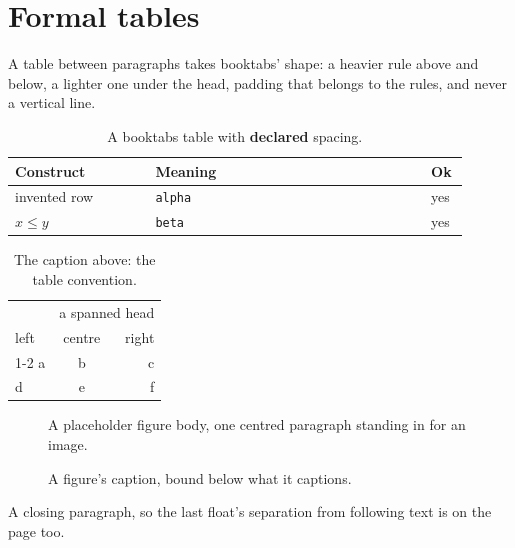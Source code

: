 \documentclass{article}
\begin{document}
\section{Formal tables}

A table between paragraphs takes booktabs' shape: a heavier rule above and
below, a lighter one under the head, padding that belongs to the rules, and
never a vertical line.

\begin{table}
\centering
\begin{tabular}{@{}p{0.29\linewidth}p{0.55\linewidth}p{0.06\linewidth}@{}}
  \toprule
  \textbf{Construct} & \textbf{Meaning} & \textbf{Ok} \\
  \midrule
  invented row & \texttt{alpha} & yes \\
  $x \leq y$ & \texttt{beta} & yes \\
  \bottomrule
\end{tabular}
\caption{A booktabs table with \textbf{declared} spacing.}
\end{table}

\begin{table}
\caption{The caption above: the table convention.}
\centering
\begin{tabular}{lcr}
  \toprule
  & \multicolumn{2}{c}{a spanned head} \\
  left & centre & right \\
  \cmidrule(lr){1-2}
  a & b & c \\
  \addlinespace
  d & e & f \\
  \bottomrule
\end{tabular}
\end{table}

\begin{figure}
\centering
A placeholder figure body, one centred paragraph standing in for an image.
\caption{A figure's caption, bound below what it captions.}
\end{figure}

A closing paragraph, so the last float's separation from following text is
on the page too.
\end{document}
